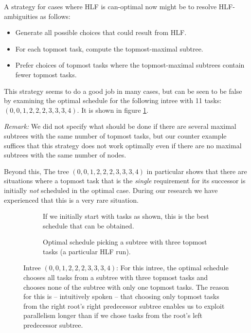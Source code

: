 A strategy for cases where HLF is can-optimal now might be to resolve HLF-ambiguities as follows:
\begin{itemize}
\item Generate all possible choices that could result from HLF.
\item For each topmost task, compute the topmost-maximal subtree.
\item Prefer choices of topmost tasks where the topmost-maximal subtrees contain fewer topmost tasks.
\end{itemize}


This strategy seems to do a good job in many cases, but can be seen to be false by examining the optimal schedule for the following intree with 11 tasks: $(0,0,1,2,2,2,3,3,3,4)$. It is shown in figure \ref{fig:subtree-with-fewest-toptasks-suboptimal}.

\emph{Remark:} We did not specify what should be done if there are several maximal subtrees with the same number of topmost tasks, but our counter example suffices that this strategy does not work optimally even if there are no maximal subtrees with the same number of nodes. 

Beyond this, The tree $(0,0,1,2,2,2,3,3,3,4)$ in particular shows that there are situations where a topmost task that is the \emph{single} requirement for its successor is initially \emph{not} scheduled in the optimal case. During our research we have experienced that this is a very rare situation.

\begin{figure}[ht]
  \centering
  \begin{subfigure}{.45\textwidth}
    \centering
    
    \caption{If we initially start with tasks as shown, this is the best schedule that can be obtained.}
  \end{subfigure}
  \quad
  \begin{subfigure}{.45\textwidth}
    \centering
    
    \caption{Optimal schedule picking a subtree with three topmost tasks (a particular HLF run).}
  \end{subfigure}
\caption{Intree $(0,0,1,2,2,2,3,3,3,4)$: For this intree, the optimal schedule chooses all tasks from a subtree with three topmost tasks and chooses none of the subtree with only one topmost tasks. The reason for this is -- intuitively spoken -- that choosing only topmost tasks from the right root's right predecessor subtree enables us to exploit parallelism longer than if we chose tasks from the root's left predecessor subtree.}
  \label{fig:subtree-with-fewest-toptasks-suboptimal}
\end{figure}


